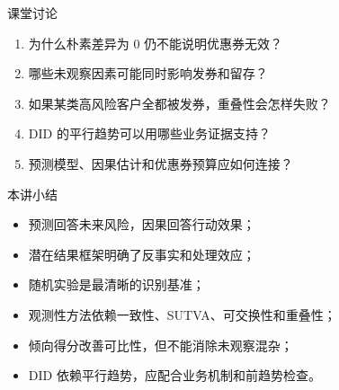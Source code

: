 \documentclass[UTF8,fontset=fandol,aspectratio=169,11pt]{ctexbeamer}
\begin{document}
\begin{frame}{课堂讨论}
\begin{enumerate}
  \item 为什么朴素差异为 0 仍不能说明优惠券无效？
  \item 哪些未观察因素可能同时影响发券和留存？
  \item 如果某类高风险客户全都被发券，重叠性会怎样失败？
  \item DID 的平行趋势可以用哪些业务证据支持？
  \item 预测模型、因果估计和优惠券预算应如何连接？
\end{enumerate}
\end{frame}

\begin{frame}{本讲小结}
\begin{itemize}
  \item 预测回答未来风险，因果回答行动效果；
  \item 潜在结果框架明确了反事实和处理效应；
  \item 随机实验是最清晰的识别基准；
  \item 观测性方法依赖一致性、SUTVA、可交换性和重叠性；
  \item 倾向得分改善可比性，但不能消除未观察混杂；
  \item DID 依赖平行趋势，应配合业务机制和前趋势检查。
\end{itemize}
\end{frame}
\end{document}
